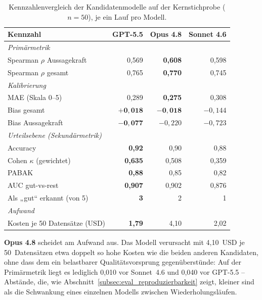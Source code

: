 \begin{table}[H]
    \centering
    \scriptsize
    \renewcommand{\arraystretch}{1.2}
    \begin{tabular}{p{6.2cm}rrr}
    \hline
    \textbf{Kennzahl} & \textbf{GPT-5.5} & \textbf{Opus 4.8} & \textbf{Sonnet 4.6} \\
    \hline
    \multicolumn{4}{l}{\textit{Primärmetrik}} \\
    Spearman $\rho$ Aussagekraft & 0,569 & \textbf{0,608} & 0,598 \\
    Spearman $\rho$ gesamt & 0,765 & \textbf{0,770} & 0,745 \\
    \hline
    \multicolumn{4}{l}{\textit{Kalibrierung}} \\
    MAE (Skala 0--5) & 0,289 & \textbf{0,275} & 0,308 \\
    Bias gesamt & $\mathbf{+0{,}018}$ & $\mathbf{-0{,}018}$ & $-0{,}144$ \\
    Bias Aussagekraft & $\mathbf{-0{,}077}$ & $-0{,}220$ & $-0{,}723$ \\
    \hline
    \multicolumn{4}{l}{\textit{Urteilsebene (Sekundärmetrik)}} \\
    Accuracy & \textbf{0,92} & 0,90 & 0,88 \\
    Cohen $\kappa$ (gewichtet) & \textbf{0,635} & 0,508 & 0,359 \\
    PABAK & \textbf{0,88} & 0,85 & 0,82 \\
    AUC gut-vs-rest & \textbf{0,907} & 0,902 & 0,876 \\
    Als „gut“ erkannt (von 5) & \textbf{3} & 2 & 1 \\
    \hline
    \multicolumn{4}{l}{\textit{Aufwand}} \\
    Kosten je 50 Datensätze (USD) & \textbf{1,79} & 4,10 & 2,02 \\
    \hline
    \end{tabular}
    \captionsetup{justification=centering}
    \caption[Kennzahlenvergleich der Kandidatenmodelle]{Kennzahlenvergleich der Kandidatenmodelle auf der Kernstichprobe ($n = 50$), je ein Lauf pro Modell.}
    \label{tab:modellauswahl_kennzahlen}
\end{table}

\textbf{Opus 4.8} scheidet am Aufwand aus. Das Modell verursacht mit 4,10~USD je
50~Datensätzen etwa doppelt so hohe Kosten wie die beiden anderen Kandidaten, ohne dass
dem ein belastbarer Qualitätsvorsprung gegenüberstünde: Auf der Primärmetrik liegt es
lediglich 0,010 vor Sonnet~4.6 und 0,040 vor GPT-5.5 -- Abstände, die, wie
Abschnitt~\ref{subsec:eval_reproduzierbarkeit} zeigt, kleiner sind als die Schwankung eines einzelnen Modells zwischen
Wiederholungsläufen.

